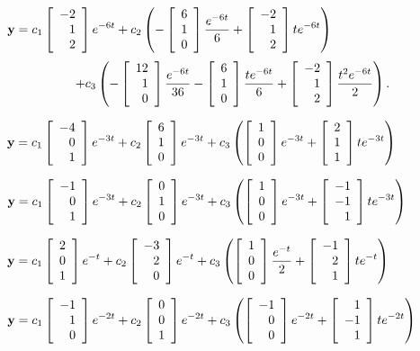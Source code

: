 \smallskip
{}
 ${\bf y}=\dst{c_{1}\threecol{-2}12e^{-6t}+
c_{2}\left(-\threecol610{\frac{e^{-6t}}{6}}+\threecol{-2}12te^{-6t}\right)}$
$$+c_{3}\left(-\threecol{12}10{\frac{e^{-6t}}{36}}-\threecol610{\frac{t
e^{-6t}}{6}}+\threecol{-2}12{\frac{t^{2}e^{-6t}}{2}}\right).$$

\smallskip
{}
 ${\bf y}=\dst{c_{1}\threecol{-4}01e^{-3t}+c_{2}\threecol610e^{-3t}+
c_{3}\left(\threecol100e^{-3t}+\threecol211te^{-3t}\right)}$

\smallskip

${\bf
y}=\dst{c_1\threecol{-1}01e^{-3t}+c_2\threecol010e^{-3t}+c_3\left
(\threecol100e^{-3t}+\threecol{-1}{-1}1te^{-3t}\right)}$

\smallskip

 ${\bf y}=\dst{
c_1\threecol201e^{-t}+c_2\threecol{-3}20e^{-t}+c_3\left
(\threecol100{\frac{e^{-t}}{2}}+\threecol{-1}21te^{-t}\right)}$

\smallskip
{}
 ${\bf y}=\dst{
c_1\threecol{-1}10e^{-2t}+c_2\threecol001e^{-2t}+c_3\left
(\threecol{-1}00e^{-2t}+\threecol1{-1}1te^{-2t}\right)}$

